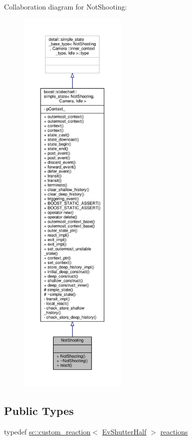 Collaboration diagram for Not\+Shooting\+:
\nopagebreak
\begin{figure}[H]
\begin{center}
\leavevmode
\includegraphics[height=550pt]{struct_not_shooting__coll__graph}
\end{center}
\end{figure}
\subsection*{Public Types}
\begin{DoxyCompactItemize}
\item 
typedef \mbox{\hyperlink{classboost_1_1statechart_1_1custom__reaction}{sc\+::custom\+\_\+reaction}}$<$ \mbox{\hyperlink{struct_ev_shutter_half}{Ev\+Shutter\+Half}} $>$ \mbox{\hyperlink{struct_not_shooting_a6c02cc14896827aa0a1133ec77903de1}{reactions}}
\end{DoxyCompactItemize}
